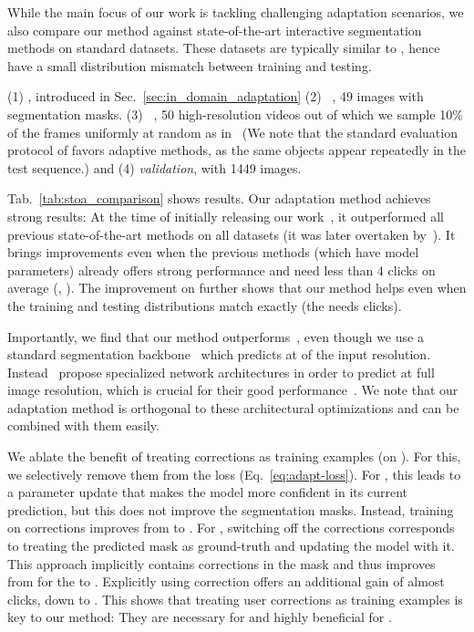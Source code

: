 While the main focus of our work is tackling challenging adaptation scenarios, we also compare our method
against state-of-the-art interactive segmentation methods on standard datasets.
These datasets are typically similar to \pascal{}, hence have a small distribution mismatch between training and testing.


(1) \berkeley{}, introduced in Sec.~\ref{sec:in_domain_adaptation}
(2) \textit{\grabcut{}}~\cite{Rother04-tdfixed}, 49 images with segmentation masks.
(3) \textit{\davis{}}~\cite{perazzi16cvpr}, 50 high-resolution videos out of which we sample 10\% of the frames uniformly at random as in~\cite{li18cvpr,jang19cvpr} (We note that the standard evaluation protocol of \davis{} favors adaptive methods, as the same objects appear repeatedly in the test sequence.) and 
(4) \textit{\pascal{} validation}, with 1449 images.


Tab.~\ref{tab:stoa_comparison} shows results. Our adaptation method achieves strong results:
At the time of initially releasing our work~\cite{kontogianni19arxiv}, it outperformed all previous state-of-the-art methods on all datasets (it was later overtaken by~\cite{sofiiuk20cvpr}).
It brings improvements even when the previous methods (which have \fixedmodel{} model parameters) already offers strong performance and need less than 4 clicks on average (\pascal{}, \grabcut{}). The improvement on \pascal{} further shows that our method helps even when the training and testing distributions match exactly (the \fixedmodellong{} needs  clicks).

Importantly, we find that our method outperforms~\cite{li18cvpr,jang19cvpr}, even though we use a standard segmentation backbone~\cite{chen18eccv} which predicts at  of the input resolution. Instead~\cite{li18cvpr,jang19cvpr} propose specialized network architectures in order to predict at full image resolution, which is crucial for their good performance~\cite{jang19cvpr}.
We note that our adaptation method is orthogonal to these architectural optimizations and can be combined with them easily.

\label{sec:ablation}
We ablate the benefit of treating corrections as training examples (on \cocounseenlarge{}).
For this, we selectively remove them from the loss (Eq.~\eqref{eq:adapt-loss}).
For \imageSGD{}, this leads to a parameter update that makes the model more confident in its current prediction, but this does not improve the segmentation masks. Instead, training on corrections improves  from  to .
For \datasetSGD{}, switching off the corrections corresponds to treating the predicted mask as ground-truth and updating the model with it.
This approach implicitly contains corrections in the mask and thus improves ~ from  for the \fixedmodellong{} to .
Explicitly using correction offers an additional gain of almost  clicks, down to .
This shows that treating user corrections as training examples is key to our method:
They are necessary for \imageSGD{} and highly beneficial for \datasetSGD{}.

